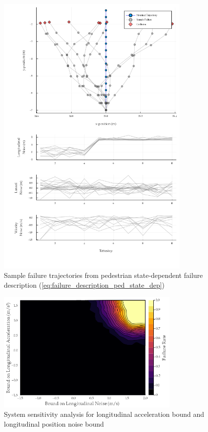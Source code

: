 \begin{figure}
    \includegraphics[width=0.85\textwidth]{figures/interpretable_validation/state_dep_failure_examples.png}
    \caption{Sample failure trajectories from pedestrian state-dependent failure description (\cref{eq:failure_description_ped_state_dep})}
    \label{fig:ped_state_dep_sample_failures}
\end{figure}


\begin{figure}
    \centering
    \includegraphics[width=0.8\textwidth]{figures/interpretable_validation/state_dep_result_sensitivity.png}
    \caption{System sensitivity analysis for longitudinal acceleration bound and longitudinal position noise bound}
    \label{fig:ped_state_sensititivty}
\end{figure}



